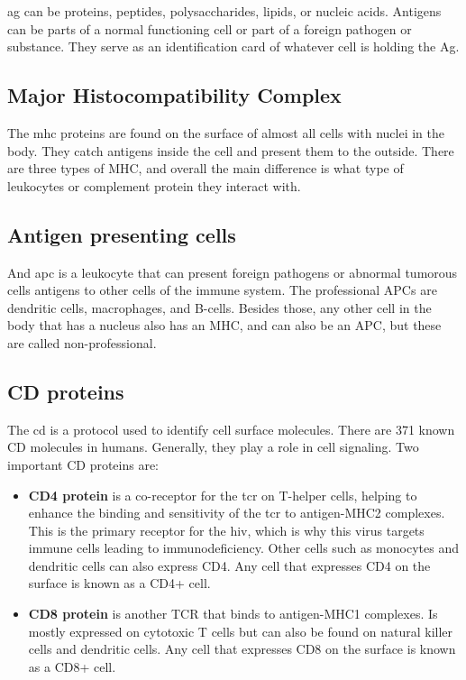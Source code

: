\gls{ag} can be proteins, peptides, polysaccharides, lipids, or nucleic acids. Antigens can be parts of a normal functioning cell or part of a foreign pathogen or substance. They serve as an identification card of whatever cell is holding the Ag.

\subsection{Major Histocompatibility Complex}

The \gls{mhc} proteins are found on the surface of almost all cells with nuclei in the body. They catch antigens inside the cell and present them to the outside. There are three types of MHC, and overall the main difference is what type of leukocytes or complement protein they interact with.

\subsection{Antigen presenting cells}

And \gls{apc} is a leukocyte that can present foreign pathogens or abnormal tumorous cells antigens to other cells of the immune system. The professional APCs are dendritic cells, macrophages, and B-cells. Besides those, any other cell in the body that has a nucleus also has an MHC, and can also be an APC, but these are called non-professional.

\subsection{CD proteins}

The \gls{cd} is a protocol used to identify cell surface molecules. There are 371 known CD molecules in humans. Generally, they play a role in cell signaling. Two important CD proteins are:

\begin{itemize}
\label{inf:cd4cdprotein}

    \item{\textbf{CD4 protein}} is a co-receptor for the \gls{tcr} on T-helper cells, helping to enhance the binding and sensitivity of the \gls{tcr} to antigen-MHC2 complexes. This is the primary receptor for the \gls{hiv}, which is why this virus targets immune cells leading to immunodeficiency. Other cells such as monocytes and dendritic cells can also express CD4. Any cell that expresses CD4 on the surface is known as a CD4+ cell.

    \item{\textbf{CD8 protein}} is another TCR that binds to antigen-MHC1 complexes. Is mostly expressed on cytotoxic T cells but can also be found on natural killer cells and dendritic cells. Any cell that expresses CD8 on the surface is known as a CD8+ cell.
    
\end{itemize}

